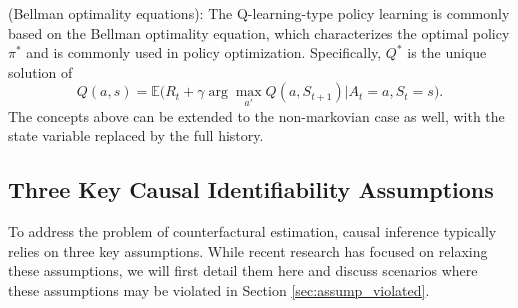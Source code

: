 
\begin{definition} (Bellman optimality equations): 
The Q-learning-type policy learning is commonly based on the Bellman optimality equation, which characterizes the optimal policy $\pi^*$ and is commonly used in policy optimization. 
Specifically, $Q^*$ is the unique solution of 
\begin{equation}
    Q(a, s) = \mathbb{E} \Big(R_t + \gamma \arg \max_{a'} Q(a, S_{t+1})  | A_t = a, S_t = s \Big).\label{eqn:bellman_Q}
\end{equation}
The concepts above can be extended to the non-markovian case as well, with the state variable replaced by the full history. 
\end{definition}






\subsection{Three Key Causal Identifiability Assumptions}\label{sec:prelim_assump}
To address the problem of counterfactural estimation, causal inference typically relies on three key assumptions. While recent research has focused on relaxing these assumptions, we will first detail them here and discuss scenarios where these assumptions may be violated in Section \ref{sec:assump_violated}.



